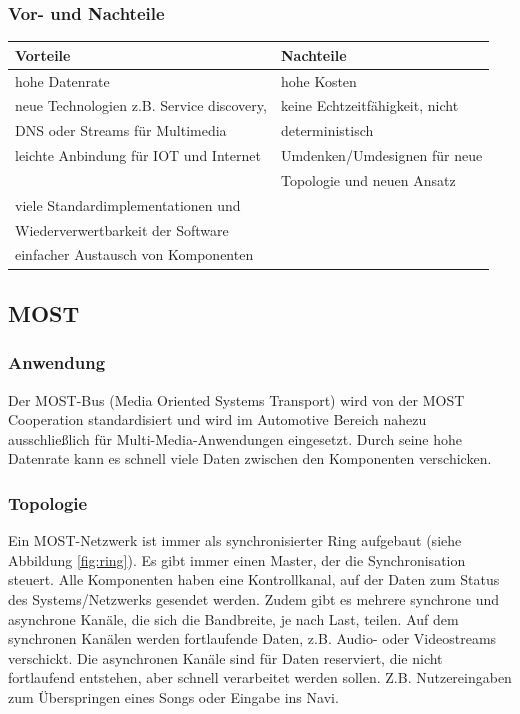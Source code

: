 \subsubsection{Vor- und Nachteile}
\begin{tabular}{l|l}
	\textbf{Vorteile} & \textbf{Nachteile}\\
	\hline hohe Datenrate & hohe Kosten\\
	\hline neue Technologien z.B. Service discovery,  & keine Echtzeitfähigkeit, nicht\\
	DNS oder Streams für Multimedia & deterministisch\\
	\hline leichte Anbindung für IOT und Internet & Umdenken/Umdesignen für neue \\
	& Topologie und neuen Ansatz\\
	\hline viele Standardimplementationen und&\\
	Wiederverwertbarkeit der Software&\\
	\hline einfacher Austausch von Komponenten &\\
\end{tabular}

\subsection{MOST}		
\subsubsection{Anwendung}
Der MOST-Bus (Media Oriented Systems Transport) wird von der MOST Cooperation standardisiert und wird im Automotive Bereich nahezu ausschließlich für Multi-Media-Anwendungen eingesetzt. Durch seine hohe Datenrate kann es schnell viele Daten zwischen den Komponenten verschicken.


\cite{.MH_Vehicle}

\subsubsection{Topologie}
Ein MOST-Netzwerk ist immer als synchronisierter Ring aufgebaut (siehe Abbildung \ref{fig:ring}). Es gibt immer einen Master, der die Synchronisation steuert. Alle Komponenten haben eine Kontrollkanal, auf der Daten zum Status des Systems/Netzwerks gesendet werden. Zudem gibt es mehrere synchrone und asynchrone Kanäle, die sich die Bandbreite, je nach Last, teilen.
Auf dem synchronen Kanälen werden fortlaufende Daten, z.B. Audio- oder Videostreams verschickt.
Die asynchronen Kanäle sind für Daten reserviert, die nicht fortlaufend entstehen, aber schnell verarbeitet werden sollen. Z.B. Nutzereingaben zum Überspringen eines Songs oder Eingabe ins Navi. \cite{BP01}

